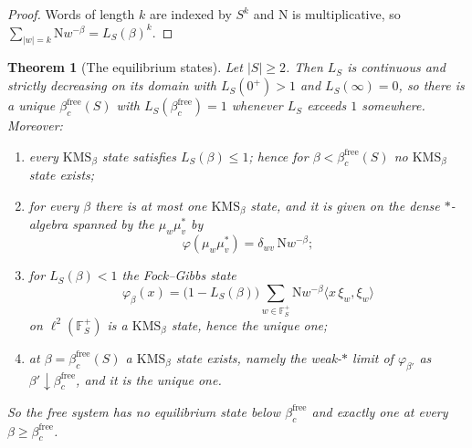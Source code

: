 \documentclass[11pt]{amsart}
\numberwithin{equation}{section}
\newtheorem{theorem}{Theorem}[section]
\theoremstyle{definition}
\theoremstyle{remark}
\newcommand{\F}{\mathbb{F}}
\newcommand{\Ns}{\mathrm{N}}
\newcommand{\bfree}{\beta_c^{\mathrm{free}}}
\begin{document}
\begin{proof}
Words of length $k$ are indexed by $S^k$ and $\Ns$ is multiplicative, so
$\sum_{|w|=k}\Ns w^{-\beta}=L_S(\beta)^k$.
\end{proof}

\begin{theorem}[The equilibrium states]\label{thm:betac}
Let $|S|\ge2$. Then $L_S$ is continuous and strictly decreasing on its domain with
$L_S(0^+)>1$ and $L_S(\infty)=0$, so there is a unique $\bfree(S)$ with $L_S(\bfree)=1$
whenever $L_S$ exceeds $1$ somewhere. Moreover:
\begin{enumerate}
\item every $\mathrm{KMS}_\beta$ state satisfies $L_S(\beta)\le1$; hence for
$\beta<\bfree(S)$ \emph{no $\mathrm{KMS}_\beta$ state exists};
\item for every $\beta$ there is at most one $\mathrm{KMS}_\beta$ state, and it is given
on the dense $*$-algebra spanned by the $\mu_w\mu_v^*$ by
\begin{equation}\label{eq:unique}
\varphi(\mu_w\mu_v^*)=\delta_{wv}\,\Ns w^{-\beta};
\end{equation}
\item for $L_S(\beta)<1$ the Fock--Gibbs state
\begin{equation}\label{eq:gibbs}
\varphi_\beta(x)=\bigl(1-L_S(\beta)\bigr)\sum_{w\in\F_S^+}\Ns w^{-\beta}\bigl\langle x\,\xi_w,\xi_w\bigr\rangle
\end{equation}
on $\ell^2(\F_S^+)$ is a $\mathrm{KMS}_\beta$ state, hence the unique one;
\item at $\beta=\bfree(S)$ a $\mathrm{KMS}_\beta$ state exists, namely the weak-$*$ limit of
$\varphi_{\beta'}$ as $\beta'\downarrow\bfree$, and it is the unique one.
\end{enumerate}
So the free system has no equilibrium state below $\bfree$ and exactly one at every
$\beta\ge\bfree$.
\end{theorem}
\end{document}
